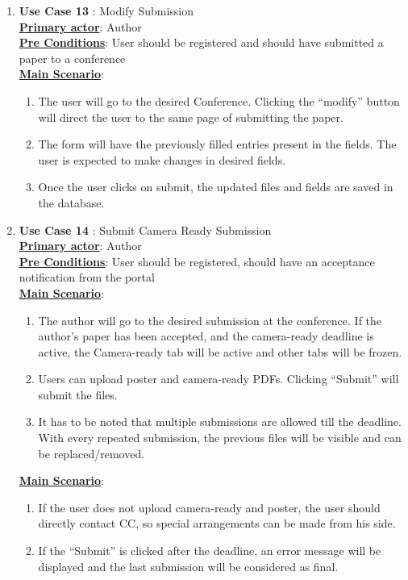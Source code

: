 \documentclass[english,a4paper,12pt]{report}
\begin{document}
\begin{enumerate}
\item \textbf{Use Case 13 }: Modify Submission \\
\underline{\textbf{Primary actor}}: Author\\
\underline{\textbf{Pre Conditions}}: User should be registered and should have submitted a paper to a conference\\
\underline{\textbf{Main Scenario}}:
\begin{enumerate}
    \item The user will go to the desired Conference. Clicking the “modify” button will direct the user to the same page of submitting the paper.
\item The form will have the previously filled entries present in the fields. The user is expected to make changes in desired fields.
\item Once the user clicks on submit, the updated files and fields are saved in
the database.   
\end{enumerate}

\item \textbf{Use Case 14 }: Submit Camera Ready Submission \\
\underline{\textbf{Primary actor}}: Author\\
\underline{\textbf{Pre Conditions}}: User should be registered, should have an acceptance notification from the portal\\
\underline{\textbf{Main Scenario}}:
\begin{enumerate}
    \item The author will go to the desired submission at the conference. If the author’s paper has been accepted, and the camera-ready deadline is
active, the Camera-ready tab will be active and other tabs will be frozen.
\item Users can upload poster and camera-ready PDFs. Clicking “Submit” will submit the files.
\item It has to be noted that multiple submissions are allowed till the deadline. With every repeated submission, the previous files will be visible and can be replaced/removed. 
\end{enumerate}

\underline{\textbf{Main Scenario}}:
\begin{enumerate}
    \item If the user does not upload camera-ready and poster, the user should directly contact CC, so special arrangements can be made from his side.
    \item If the “Submit” is clicked after the deadline, an error message will be displayed and the last submission will be considered as final.
\end{enumerate}

\end{enumerate}
\end{document}
